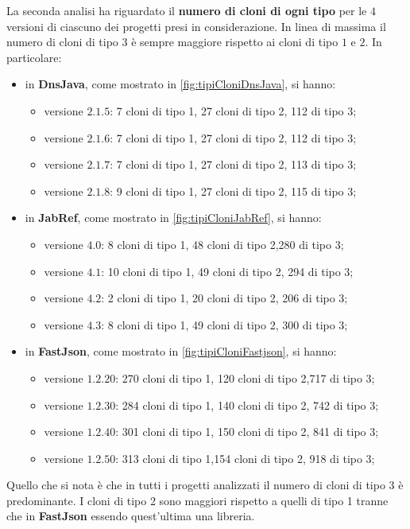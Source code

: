La seconda analisi ha riguardato il \textbf{numero di cloni di ogni tipo} per le $4$ versioni di ciascuno dei progetti presi in considerazione. In linea di massima il numero di cloni di tipo $3$ è sempre maggiore rispetto ai cloni di tipo $1$ e $2$. In particolare:
\begin{itemize}
	\item in \textbf{DnsJava}, come mostrato in \autoref{fig:tipiCloniDnsJava}, si hanno:
		\begin{itemize}
				\item versione $2.1.5$: 7 cloni di tipo 1, 27 cloni di tipo 2, 112 di tipo 3;
				\item versione $2.1.6$: 7 cloni di tipo 1, 27 cloni di tipo 2, 112 di tipo 3;
				\item versione $2.1.7$: 7 cloni di tipo 1, 27 cloni di tipo 2, 113 di tipo 3;
				\item versione $2.1.8$: 9 cloni di tipo 1, 27 cloni di tipo 2, 115 di tipo 3;		
		\end{itemize}
	\item in \textbf{JabRef}, come mostrato in \autoref{fig:tipiCloniJabRef}, si hanno:
				\begin{itemize}
			\item versione $4.0$: 8 cloni di tipo 1, 48 cloni di tipo 2,280 di tipo 3;
			\item versione $4.1$: 10 cloni di tipo 1, 49 cloni di tipo 2, 294 di tipo 3;
			\item versione $4.2$: 2 cloni di tipo 1, 20 cloni di tipo 2, 206 di tipo 3;
			\item versione $4.3$: 8 cloni di tipo 1, 49 cloni di tipo 2, 300 di tipo 3;		
		\end{itemize}
	\item in \textbf{FastJson}, come mostrato in \autoref{fig:tipiCloniFastjson}, si hanno:
	\begin{itemize}
		\item versione $1.2.20$: 270 cloni di tipo 1, 120 cloni di tipo 2,717 di tipo 3;
		\item versione $1.2.30$: 284 cloni di tipo 1, 140 cloni di tipo 2, 742 di tipo 3;
		\item versione $1.2.40$: 301 cloni di tipo 1, 150 cloni di tipo 2, 841 di tipo 3;
		\item versione $1.2.50$: 313 cloni di tipo 1,154 cloni di tipo 2, 918 di tipo 3;		
	\end{itemize}
\end{itemize}
Quello che si nota è che in tutti i progetti analizzati il numero di cloni di tipo 3 è predominante. I cloni di tipo 2 sono maggiori rispetto a quelli di tipo 1 tranne che in \textbf{FastJson} essendo quest'ultima una libreria.
